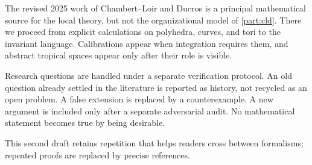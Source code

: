 The revised 2025 work of Chambert--Loir and Ducros is a principal mathematical
source for the local theory, but not the organizational model of
\cref{part:cld}.
There we proceed from explicit calculations on polyhedra, curves, and tori to
the invariant language.  Calibrations appear when integration requires them,
and abstract tropical spaces appear only after their role is visible.

Research questions are handled under a separate verification protocol.  An
old question already settled in the literature is reported as history, not
recycled as an open problem.  A false extension is replaced by a
counterexample.  A new argument is included only after a separate adversarial
audit.  No mathematical statement becomes true by being desirable.

This second draft retains repetition that helps readers cross between
formalisms; repeated proofs are replaced by precise references.
